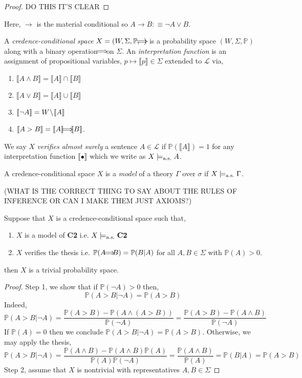 \documentclass[12pt]{article}
\renewcommand{\P}{\mathbb{P}}
\newcommand{\dbrack}[1]{\llbracket #1 \rrbracket}
\renewcommand{\L}{\mathcal{L}}
\newcommand{\as}{\mathrm{a.s.}}
\let\oldimplies\implies
\renewcommand{\implies}{\hspace{-1ex} \oldimplies \hspace{-1ex}}
\begin{document}
\begin{proof}
DO THIS IT'S CLEAR
\end{proof}


\begin{rmk}
Here, $\to$ is the material conditional so $A \to B :\equiv \neg A \vee B$.
\end{rmk}

\begin{defn}
A \textit{credence-conditional space} $X = (W, \Sigma, \P, \implies)$ is a probability space $(W, \Sigma, \P)$ along with a binary operation $\implies$ on $\Sigma$. An \textit{interpretation function} is an assignment of propositional variables, $p \mapsto \dbrack{p} \in \Sigma$ extended to $\L$ via,
\begin{enumerate}
\item $\dbrack{A \wedge B} = \dbrack{A} \cap \dbrack{B}$
\item $\dbrack{A \vee B} = \dbrack{A} \cup \dbrack{B}$
\item $\dbrack{\neg A} = W \sm \dbrack{A}$
\item $\dbrack{A > B} = \dbrack{A} \implies \dbrack{B}$.
\end{enumerate}
We say $X$ \textit{verifies almost surely} a sentence $A \in \L$ if $\P(\dbrack{A}) = 1$ for any interpretation function $\dbrack{\bullet}$ which we write as $X \entails_{\as} A$.
\end{defn}


\begin{defn}
A credence-conditional space $X$ is a \textit{model} of a theory $\Gamma$ over $\sigma$ if $X \entails_{\as} \Gamma$.
\end{defn}

(WHAT IS THE CORRECT THING TO SAY ABOUT THE RULES OF INFERENCE OR CAN I MAKE THEM JUST AXIOMS?)

\begin{theorem}[Stalnaker]
Suppose that $X$ is a credence-conditional space such that,
\begin{enumerate}
\item $X$ is a model of \textbf{C2} i.e. $X \entails_{\as} \textbf{C2}$
\item $X$ verifies the thesis i.e. $\P(A \implies B) = \P(B | A)$ for all $A, B \in \Sigma$ with $\P(A) > 0$.
\end{enumerate}
then $X$ is a trivial probability space. 
\end{theorem}

\begin{proof}
Step 1, we show that if $\P(\neg A) > 0$ then,
\[ \P(A > B | \neg A) = \P(A > B) \]
Indeed,
\[ \P(A > B | \neg A) = \frac{\P(A > B) - \P(A \wedge (A > B))}{\P(\neg A)} = \frac{\P(A > B) - \P(A \wedge B)}{\P(\neg A)} \] 
If $\P(A) = 0$ then we conclude $\P(A > B | \neg A) = \P(A > B)$. Otherwise, we may apply the thesis,
\[ \P(A > B | \neg A) = \frac{\P(A \wedge B) - \P(A \wedge B) \P(A)}{\P(A) \P(\neg A)} = \frac{\P(A \wedge B)}{\P(A)} = \P(B | A) = \P(A > B) \]
Step 2, assume that $X$ is nontrivial with representatives $A, B \in \Sigma$
\end{proof}
\end{document}
